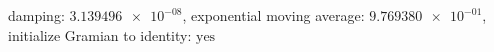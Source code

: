 damping: $\num[scientific-notation=true]{3.139496e-08}$, exponential moving average: $\num[scientific-notation=true]{9.769380e-01}$, initialize Gramian to identity: $\text{yes}$